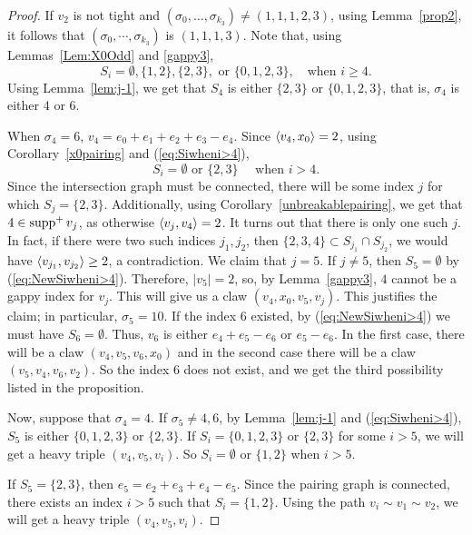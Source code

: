 \begin{proof}
If $v_2$ is not tight and $(\sigma_0,\dots,\sigma_{k_3})\not = (1,1,1,2,3)$, using Lemma~\ref{prop2}, it follows that $(\sigma_0, \cdots, \sigma_{k_3})$ is $(1,1,1,3)$. Note that, using Lemmas~\ref{Lem:X0Odd} and \ref{gappy3}, 
\begin{equation}\label{eq:Siwheni>4}
S_i=\emptyset, \{1,2\}, \{2,3\}, \text{ or } \{0,1,2,3\},\quad\text{when }i\ge4.
\end{equation}
Using Lemma~\ref{lem:j-1}, we get that $S_4$ is either $\{ 2,3\}$ or $\{ 0,1,2,3\}$, that is, $\sigma_4$ is either $4$ or $6$. 

When $\sigma_4=6$, $v_4=e_0 + e_1 + e_2 + e_3 - e_4$.  Since $\left\langle v_4 , x_0 \right\rangle=2$, using Corollary~\ref{x0pairing} and (\ref{eq:Siwheni>4}), 
\begin{equation}\label{eq:NewSiwheni>4}
S_i=\emptyset \text{ or }\{2,3\} \quad\text{ when }i>4.
\end{equation}
Since the intersection graph must be connected, there will be some index $j$ for which $S_j=\{2, 3\}$. 
Additionally, using Corollary~\ref{unbreakablepairing}, we get that $4\in \operatorname{supp}^+ v_j$, as otherwise $\left\langle v_j , v_4 \right\rangle=2$. It turns out that there is only one such $j$. In fact, if there were two such indices $j_1,j_2$, then $\{2,3,4\}\subset S_{j_1}\cap S_{j_2}$, we would have $\left\langle v_{j_1} , v_{j_2} \right\rangle\ge2$, a contradiction.
We claim that $j=5$. If $j\not = 5$, then $S_5 = \emptyset$ by (\ref{eq:NewSiwheni>4}). Therefore, $|v_5|=2$, so, by Lemma~\ref{gappy3}, $4$ cannot be a gappy index for $v_j$. This will give us a claw $(v_4, x_0, v_5, v_j)$. This justifies the claim; in particular, $\sigma_5=10$. If the index $6$ existed, by (\ref{eq:NewSiwheni>4}) we must have $S_6=\emptyset$. Thus, $v_6$ is either $e_4 + e_5 - e_6$ or $e_5 - e_6$. In the first case, there will be a claw $(v_4, v_5, v_6, x_0)$ and in the second case there will be a claw $(v_5, v_4, v_6, v_2)$. So the index $6$ does not exist, and we get the third possibility listed in the proposition.

Now, suppose that $\sigma_4=4$. If $\sigma_5\not = 4, 6$, by Lemma~\ref{lem:j-1} and (\ref{eq:Siwheni>4}), $S_5$ is either $\{ 0, 1, 2, 3\}$ or $\{ 2,3\}$. If $S_i=\{ 0, 1, 2, 3\}$ or $\{ 2,3\}$ for some $i>5$, we will get a heavy triple $(v_4, v_5, v_i)$.
So $S_i=\emptyset$ or $\{1,2\}$ when $i>5$.

If $S_5=\{ 2,3\}$, then $e_5=e_2+e_3+e_4-e_5$. Since the pairing graph is connected, there exists an index $i>5$ such that
$S_i=\{1,2\}$. Using the path $v_i\sim v_1\sim v_2$, we will get a heavy triple $(v_4, v_5, v_i)$. 


\end{proof}
